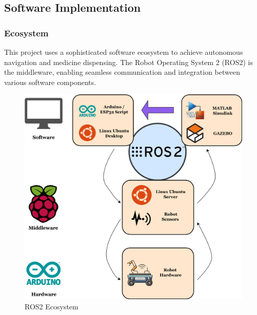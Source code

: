 \newpage
\subsection{Software Implementation}

\subsubsection{Ecosystem}
This project uses a sophisticated software ecosystem to achieve autonomous navigation and medicine dispensing. The Robot Operating System 2 (ROS2) is the middleware, enabling seamless communication and integration between various software components. 

\vspace{0.4in}

\begin{figure}[H]
    \centering
    \includegraphics[width=6.2in]{pics/illustration.png}
    \caption{ROS2 Ecosystem}\label{ros2}
\end{figure} 

\vspace{0.4in}


